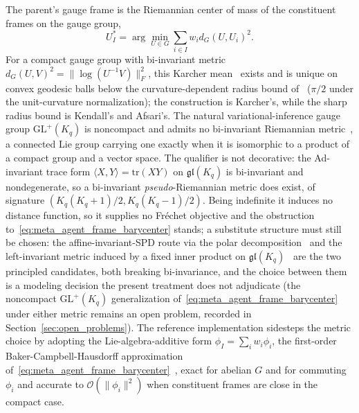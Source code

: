 \documentclass[11pt]{article}
\begin{document}
The parent's gauge frame is the Riemannian center of mass of the constituent frames on the gauge group,
\begin{equation}
U_I^* = \arg\min_{U \in G} \sum_{i \in I} w_i d_G(U, U_i)^2.
\label{eq:meta_agent_frame_barycenter}
\end{equation}
For a compact gauge group with bi-invariant metric $d_G(U, V)^2 = \|\log(U^{-1}V)\|_F^2$, this Karcher mean~\cite{Karcher1977, Pennec2009} exists and is unique on convex geodesic balls below the curvature-dependent radius bound of~\cite{Kendall1990, Afsari2011} ($\pi/2$ under the unit-curvature normalization); the construction is Karcher's, while the sharp radius bound is Kendall's and Afsari's. The natural variational-inference gauge group $\mathrm{GL}^+(K_q)$ is noncompact and admits no bi-invariant Riemannian metric~\cite[Lemma 7.5]{Milnor1976}, a connected Lie group carrying one exactly when it is isomorphic to a product of a compact group and a vector space. The qualifier is not decorative: the Ad-invariant trace form $\langle X, Y \rangle = \mathrm{tr}(XY)$ on $\mathfrak{gl}(K_q)$ is bi-invariant and nondegenerate, so a bi-invariant \emph{pseudo}-Riemannian metric does exist, of signature $(K_q(K_q+1)/2, K_q(K_q-1)/2)$. Being indefinite it induces no distance function, so it supplies no Fr\'echet objective and the obstruction to~\eqref{eq:meta_agent_frame_barycenter} stands; a substitute structure must still be chosen: the affine-invariant-SPD route via the polar decomposition~\cite{PennecFillardAyache2006} and the left-invariant metric induced by a fixed inner product on $\mathfrak{gl}(K_q)$~\cite{BonnabelSepulchre2009} are the two principled candidates, both breaking bi-invariance, and the choice between them is a modeling decision the present treatment does not adjudicate (the noncompact $\mathrm{GL}^+(K_q)$ generalization of~\eqref{eq:meta_agent_frame_barycenter} under either metric remains an open problem, recorded in Section~\ref{sec:open_problems}). The reference implementation sidesteps the metric choice by adopting the Lie-algebra-additive form $\phi_I = \sum_i w_i \phi_i$, the first-order Baker-Campbell-Hausdorff approximation of~\eqref{eq:meta_agent_frame_barycenter}~\cite{Hall2015}, exact for abelian $G$ and for commuting $\phi_i$ and accurate to $\mathcal{O}(\|\phi_i\|^2)$ when constituent frames are close in the compact case.
\end{document}
